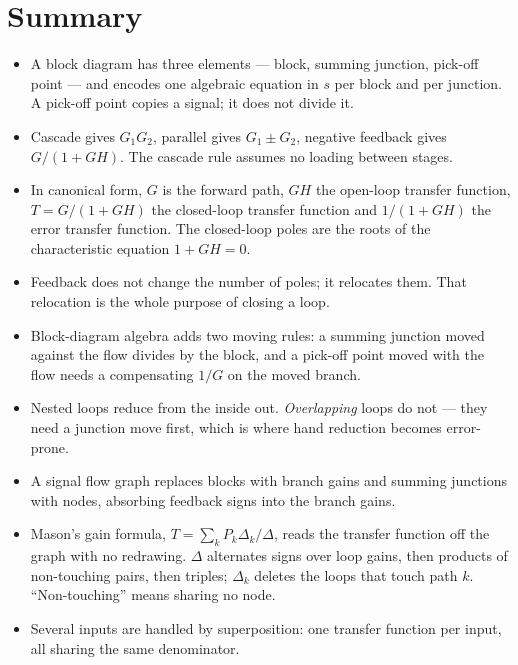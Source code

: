 \documentclass[11pt,a4paper]{article}
\begin{document}
\section*{Summary}

\begin{itemize}
\item A block diagram has three elements --- block, summing junction, pick-off
      point --- and encodes one algebraic equation in $s$ per block and per
      junction. A pick-off point copies a signal; it does not divide it.
\item Cascade gives $G_1G_2$, parallel gives $G_1\pm G_2$, negative feedback
      gives $G/(1+GH)$. The cascade rule assumes no loading between stages.
\item In canonical form, $G$ is the forward path, $GH$ the open-loop transfer
      function, $T=G/(1+GH)$ the closed-loop transfer function and
      $1/(1+GH)$ the error transfer function. The closed-loop poles are the
      roots of the characteristic equation $1+GH=0$.
\item Feedback does not change the number of poles; it relocates them. That
      relocation is the whole purpose of closing a loop.
\item Block-diagram algebra adds two moving rules: a summing junction moved
      against the flow divides by the block, and a pick-off point moved with
      the flow needs a compensating $1/G$ on the moved branch.
\item Nested loops reduce from the inside out. \emph{Overlapping} loops do not
      --- they need a junction move first, which is where hand reduction
      becomes error-prone.
\item A signal flow graph replaces blocks with branch gains and summing
      junctions with nodes, absorbing feedback signs into the branch gains.
\item Mason's gain formula, $T=\sum_kP_k\Delta_k/\Delta$, reads the transfer
      function off the graph with no redrawing. $\Delta$ alternates signs over
      loop gains, then products of non-touching pairs, then triples;
      $\Delta_k$ deletes the loops that touch path $k$. ``Non-touching'' means
      sharing no node.
\item Several inputs are handled by superposition: one transfer function per
      input, all sharing the same denominator.
\end{itemize}

\end{document}

